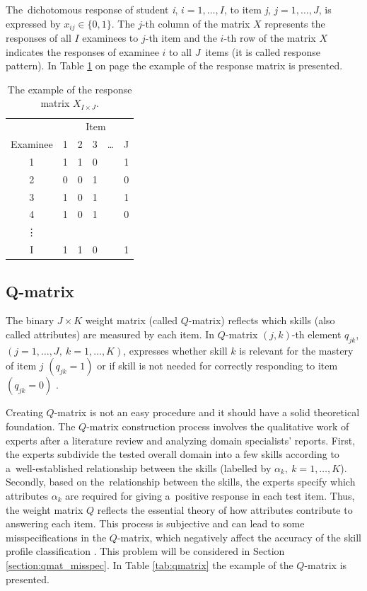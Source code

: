\documentclass[english]{pwr_wmat_praca_dyplomowa}
\theoremstyle{plain}
\numberwithin{theorem}{chapter}
\theoremstyle{definition}
\numberwithin{theorem}{chapter}
\begin{document}
	The~dichotomous response of student \textit{i}, $i = 1, \ldots , I$, to item \textit{j}, $j = 1, \ldots , J$, is expressed by $x_{ij} \in \{0,1\}$. The $j$-th column of the matrix $X$ represents the responses of all $I$ examinees to $j$-th item and the $i$-th row of the matrix $X$ indicates the responses of examinee $i$ to all $J$~items (it is called response pattern). In Table \ref{tab:responsemat} on page \pageref{tab:responsemat} the example of the response matrix is presented.
	
	\begin{table}[t]
		\centering
		\begin{tabular}{c c c c c c} 
			\hline
			{\rule{0pt}{3ex}} & \multicolumn{5}{c}{Item} \\
			Examinee & 1 & 2 & 3 & \ldots & J \\ [0.5ex] 
			\hline
			1 & 1 & 1 & 0 & & 1 \\ 
			2 & 0 & 0 & 1 & & 0 \\
			3 & 1 & 0 & 1 & & 1 \\
			4 & 1 & 0 & 1 & & 0 \\
			\vdots & & & & & \\
			I & 1 & 1 & 0 & & 1\\ [1ex] 
			\hline
		\end{tabular}
		\caption{The example of the response matrix $X_{I \times J}$.}
		\label{tab:responsemat} 
	\end{table}
	
	\subsection{Q-matrix}
	
	The binary $J \times K$ weight matrix (called $Q$-matrix) reflects which skills (also called attributes) are measured by each item. In $Q$-matrix $(j,k)$-th element $q_{jk}$, $(j=1,\ldots,J, \: k=1,\ldots,K)$, expresses whether skill $k$ is relevant for the mastery of item $j$ $(q_{jk} = 1)$ or if skill is not needed for correctly responding to item $(q_{jk} = 0)$ \cite{cdm_in_r}. 
	
	Creating $Q$-matrix is not an easy procedure and it should have a solid theoretical foundation. The $Q$-matrix construction process involves the qualitative work of experts after a literature review and analyzing domain specialists' reports. First, the experts subdivide the tested overall domain into a few skills according to a~well-established relationship between the skills (labelled by $\alpha_k, \: k = 1,\ldots,K$). Secondly, based on the~relationship between the skills, the experts specify which attributes $\alpha_k$ are required for giving a~positive response in each test item. Thus, the weight matrix $Q$ reflects the essential theory of how attributes contribute to answering each item. This process is subjective and can lead to some misspecifications in the $Q$-matrix, which negatively affect the accuracy of the skill profile classification \cite{de_la_torre_2016}. This problem will be considered in Section \ref{section:qmat_misspec}. In Table \ref{tab:qmatrix} the example of the $Q$-matrix is presented.
	
\end{document}
